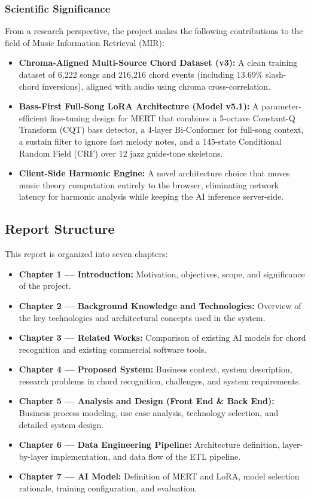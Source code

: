 \documentclass[a4paper]{article}
\begin{document}
\subsubsection{Scientific Significance}

From a research perspective, the project makes the following contributions to the field of Music Information Retrieval (MIR):
\begin{itemize}
    \item \textbf{Chroma-Aligned Multi-Source Chord Dataset (v3):} A clean training dataset of 6,222 songs and 216,216 chord events (including 13.69\% slash-chord inversions), aligned with audio using chroma cross-correlation.
    \item \textbf{Bass-First Full-Song LoRA Architecture (Model v5.1):} A parameter-efficient fine-tuning design for MERT that combines a 5-octave Constant-Q Transform (CQT) bass detector, a 4-layer Bi-Conformer for full-song context, a sustain filter to ignore fast melody notes, and a 145-state Conditional Random Field (CRF) over 12 jazz guide-tone skeletons.
    \item \textbf{Client-Side Harmonic Engine:} A novel architecture choice that moves music theory computation entirely to the browser, eliminating network latency for harmonic analysis while keeping the AI inference server-side.
\end{itemize}

\subsection{Report Structure}

This report is organized into seven chapters:

\begin{itemize}
    \item \textbf{Chapter 1 --- Introduction:} Motivation, objectives, scope, and significance of the project.
    \item \textbf{Chapter 2 --- Background Knowledge and Technologies:} Overview of the key technologies and architectural concepts used in the system.
    \item \textbf{Chapter 3 --- Related Works:} Comparison of existing AI models for chord recognition and existing commercial software tools.
    \item \textbf{Chapter 4 --- Proposed System:} Business context, system description, research problems in chord recognition, challenges, and system requirements.
    \item \textbf{Chapter 5 --- Analysis and Design (Front End \& Back End):} Business process modeling, use case analysis, technology selection, and detailed system design.
    \item \textbf{Chapter 6 --- Data Engineering Pipeline:} Architecture definition, layer-by-layer implementation, and data flow of the ETL pipeline.
    \item \textbf{Chapter 7 --- AI Model:} Definition of MERT and LoRA, model selection rationale, training configuration, and evaluation.
\end{itemize}
\end{document}
